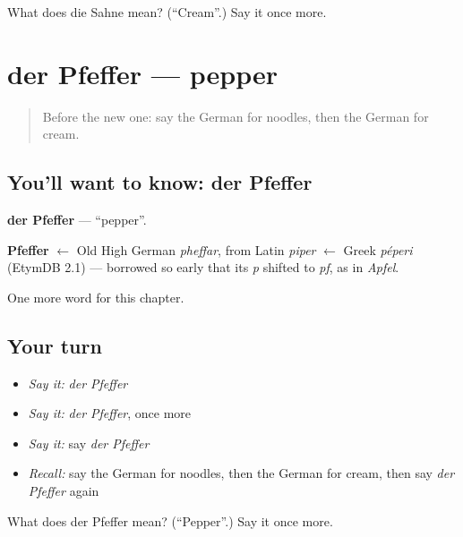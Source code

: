 \begin{tcolorbox}[breakable,colback=teal!4,colframe=teal!35!black,title={Before you move on}]
What does die Sahne mean? (\textquotedblleft{}Cream\textquotedblright{}.) Say it once more.
\end{tcolorbox}
\section[der Pfeffer]{der Pfeffer — pepper}

\label{lesson:GE-C75-pfeffer}



\begin{quote}
Before the new one: say the German for noodles, then the German for cream.
\end{quote}

\subsection*{You'll want to know: der Pfeffer}
\textbf{der Pfeffer} — \textquotedblleft{}pepper\textquotedblright{}.

\begin{cousinweb}
\textbf{Pfeffer} $\leftarrow$ Old High German \emph{pheffar}, from Latin \emph{piper} $\leftarrow$ Greek \emph{péperi} (EtymDB 2.1) — borrowed so early that its \emph{p} shifted to \emph{pf}, as in \emph{Apfel}.
\end{cousinweb}

\begin{grammarlens}[title={What you've built}]
One more word for this chapter.
\end{grammarlens}

\subsection*{Your turn}
\begin{itemize}
\raggedright
  \item \emph{Say it:} \emph{der Pfeffer}
  \item \emph{Say it:} \emph{der Pfeffer}, once more
  \item \emph{Say it:} say \emph{der Pfeffer}
  \item \emph{Recall:} say the German for noodles, then the German for cream, then say \emph{der Pfeffer} again
\end{itemize}

\begin{tcolorbox}[breakable,colback=teal!4,colframe=teal!35!black,title={Before you move on}]
What does der Pfeffer mean? (\textquotedblleft{}Pepper\textquotedblright{}.) Say it once more.
\end{tcolorbox}
